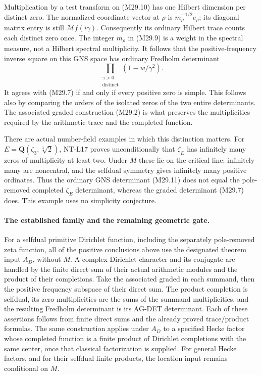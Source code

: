 Multiplication by a test transform on (M29.10)
has one Hilbert dimension per distinct zero.
The normalized coordinate vector at \(\rho\)
is \(m_\rho^{-1/2}e_\rho\); its diagonal matrix
entry is still \(\mathcal Mf(i\gamma)\).
Consequently its ordinary Hilbert trace counts
each distinct zero once. The integer \(m_\rho\)
in (M29.9) is a weight in the spectral measure,
not a Hilbert spectral multiplicity.
It follows that the positive-frequency inverse
square on this GNS space has ordinary
Fredholm determinant
\[
                \prod_{\substack{\gamma>0\\\text{distinct}}}
                                      (1-w/\gamma^2).         \tag{M29.11}
\]
It agrees with (M29.7) if and only if every
positive zero is simple. This follows also
by comparing the orders of the isolated
zeros of the two entire determinants.
The associated graded construction (M29.2)
is what preserves the multiplicities required
by the arithmetic trace and the completed
function.

There are actual number-field examples in which
this distinction matters. For
\(E=\mathbf Q(\zeta_3,\sqrt[3]{2})\), NT-L17
proves unconditionally that \(\zeta_E\) has
infinitely many zeros of multiplicity at
least two. Under \(M\) these lie on the
critical line; infinitely many are
noncentral, and the selfdual symmetry
gives infinitely many positive ordinates.
Thus the ordinary GNS determinant (M29.11)
does not equal the pole-removed completed
\(\zeta_E\) determinant, whereas the
graded determinant (M29.7) does.
This example uses no simplicity conjecture.

\paragraph{The established family and the remaining geometric gate.}
For a selfdual primitive Dirichlet function,
including the separately pole-removed zeta
function, all of the positive conclusions
above use the designated theorem input
\(A_D\), without \(M\). A complex Dirichlet
character and its conjugate are handled
by the finite direct sum of their actual
arithmetic modules and the product of
their completions. Take the associated
graded in each summand, then the positive
frequency subspace of their direct sum.
The product completion is selfdual, its
zero multiplicities are the sums of the
summand multiplicities, and the resulting
Fredholm determinant is its AG-DET
determinant. Each of these assertions
follows from finite direct sums and the
already proved trace/product formulas.
The same construction applies under \(A_D\)
to a specified Hecke factor whose completed
function is a finite product of Dirichlet
completions with the same center, once
that classical factorization is supplied.
For general Hecke factors, and for their
selfdual finite products, the location
input remains conditional on \(M\).

